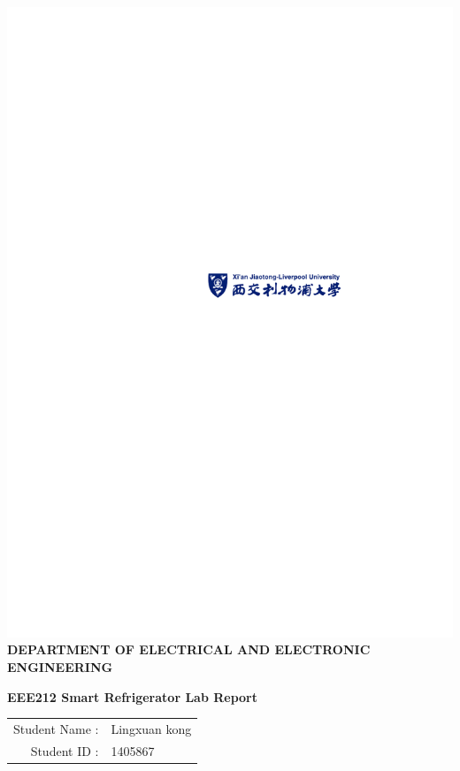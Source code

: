 \documentclass[12pt,onecolumn]{article}
\begin{document}
\begin{titlepage}
\begin{center}
\includegraphics[scale=1.5]{CoverSheet}\\
\bf{ DEPARTMENT OF ELECTRICAL AND ELECTRONIC ENGINEERING }
\end{center}
\vspace{18mm}
 \begin{center}
 \begin{Large}
 \vspace{2.0cm}
 \bf{EEE212 Smart Refrigerator Lab Report}
 \end{Large}
 \end{center} 
\vspace{2.0cm}
  \begin{center}
  \begin{large}
     \begin{tabular}{r@{ }l} 
       Student Name : & Lingxuan kong\\ 
       Student ID : & 1405867\\ 
       
    \end{tabular}
  \end{large}
  \end{center}
\clearpage
\end{titlepage}
\end{document}
